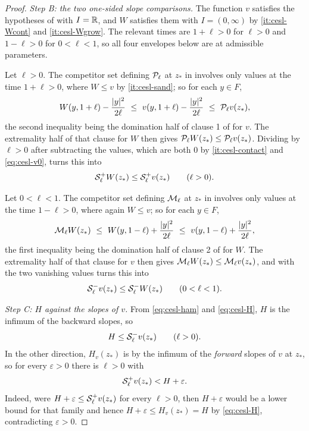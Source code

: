 \begin{proof}
\emph{Step B: the two one-sided slope comparisons.} The function $v$ satisfies
the hypotheses of  with $I=\mathbb{R}$, and $W$
satisfies them with $I=(0,\infty)$ by \ref{it:cesl-Wcont} and
\ref{it:cesl-Wgrow}. The relevant times are $1+\ell>0$ for $\ell>0$ and
$1-\ell>0$ for $0<\ell<1$, so all four envelopes below are at admissible
parameters.

Let $\ell>0$. The competitor set defining $\mathcal{P}_\ell$ at $z_*$ in
 involves only values at the time $1+\ell>0$, where $W\le v$
by \ref{it:cesl-sand}; so for each $y\in F$,
\[
  W(y,1+\ell)-\frac{|y|^2}{2\ell}\ \le\ v(y,1+\ell)-\frac{|y|^2}{2\ell}
   \ \le\ \Penv_\ell v(z_*) ,
\]
the second inequality being the domination half of clause 1 of
 for $v$. The extremality half of that clause
for $W$ then gives $\mathcal{P}_\ell W(z_*)\le\mathcal{P}_\ell v(z_*)$. Dividing by
$\ell>0$ after subtracting the values, which are both $0$ by
\ref{it:cesl-contact} and \eqref{eq:cesl-v0},  turns this
into
\begin{equation}\label{eq:cesl-plus}
  \mathcal{S}_\ell^+W(z_*)\le\mathcal{S}_\ell^+v(z_*)\qquad(\ell>0).
\end{equation}

Let $0<\ell<1$. The competitor set defining $\mathcal{M}_\ell$ at $z_*$ in
 involves only values at the time $1-\ell>0$, where again
$W\le v$; so for each $y\in F$,
\[
  \Menv_\ell W(z_*)\ \le\ W(y,1-\ell)+\frac{|y|^2}{2\ell}
   \ \le\ v(y,1-\ell)+\frac{|y|^2}{2\ell} ,
\]
the first inequality being the domination half of clause 2 of
 for $W$. The extremality half of that clause
for $v$ then gives $\mathcal{M}_\ell W(z_*)\le\mathcal{M}_\ell v(z_*)$, and
 with the two vanishing values turns this into
\begin{equation}\label{eq:cesl-minus}
  \mathcal{S}_\ell^-v(z_*)\le\mathcal{S}_\ell^-W(z_*)\qquad(0<\ell<1).
\end{equation}

\emph{Step C: $H$ against the slopes of $v$.} From \eqref{eq:cesl-ham} and
\eqref{eq:cesl-H}, $H$ is the infimum of the backward slopes, so
\begin{equation}\label{eq:cesl-lowerM}
  H\le\mathcal{S}_\ell^-v(z_*)\qquad(\ell>0).
\end{equation}
In the other direction, $H_v(z_*)$ is by  the infimum of
the \emph{forward} slopes of $v$ at $z_*$, so for every $\varepsilon>0$ there is
$\ell>0$ with
\begin{equation}\label{eq:cesl-infP}
  \mathcal{S}_\ell^+v(z_*)<H+\varepsilon .
\end{equation}
Indeed, were $H+\varepsilon\le\mathcal{S}_\ell^+v(z_*)$ for every $\ell>0$, then
$H+\varepsilon$ would be a lower bound for that family and hence
$H+\varepsilon\le H_v(z_*)=H$ by \eqref{eq:cesl-H}, contradicting
$\varepsilon>0$.


\end{proof}
